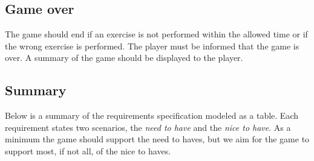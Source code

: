 \documentclass[11pt]{report}
\begin{document}
\subsection{Game over}
The game should end if an exercise is not performed within the allowed time or if the wrong exercise is performed. The player must be informed that the game is over. A summary of the game should be displayed to the player.

\subsection{Summary}
Below is a summary of the requirements specification modeled as a table. Each requirement states two scenarios, the \emph{need to have} and the \emph{nice to have}. As a minimum the game should support the need to haves, but we aim for the game to support most, if not all, of the nice to haves. 
\end{document}
